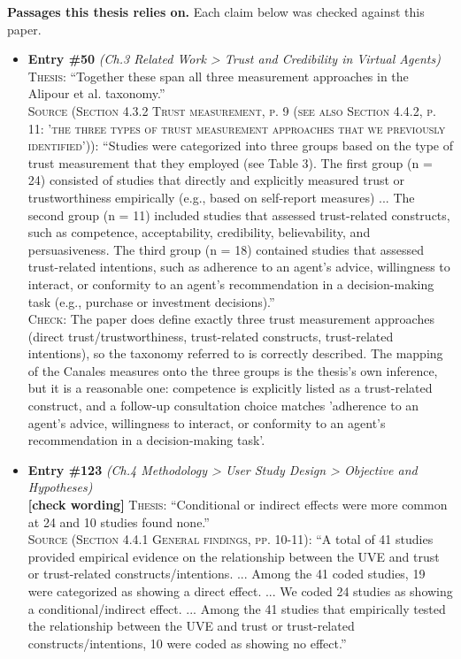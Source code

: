 \documentclass[11pt, a4paper]{article}
\begin{document}
\textbf{Passages this thesis relies on.} Each claim below was checked against this paper.
\begin{itemize}[leftmargin=1.2em,itemsep=4pt]
\item \textbf{Entry \#50} \textit{(Ch.3 Related Work > Trust and Credibility in Virtual Agents)}\\
\textsc{Thesis:} ``Together these span all three measurement approaches in the Alipour et al. taxonomy.''\\
\textsc{Source (Section 4.3.2 Trust measurement, p. 9 (see also Section 4.4.2, p. 11: 'the three types of trust measurement approaches that we previously identified')):} ``Studies were categorized into three groups based on the type of trust measurement that they employed (see Table 3). The first group (n = 24) consisted of studies that directly and explicitly measured trust or trustworthiness empirically (e.g., based on self-report measures) ... The second group (n = 11) included studies that assessed trust-related constructs, such as competence, acceptability, credibility, believability, and persuasiveness. The third group (n = 18) contained studies that assessed trust-related intentions, such as adherence to an agent's advice, willingness to interact, or conformity to an agent's recommendation in a decision-making task (e.g., purchase or investment decisions).''\\
\textsc{Check:} The paper does define exactly three trust measurement approaches (direct trust/trustworthiness, trust-related constructs, trust-related intentions), so the taxonomy referred to is correctly described. The mapping of the Canales measures onto the three groups is the thesis's own inference, but it is a reasonable one: competence is explicitly listed as a trust-related construct, and a follow-up consultation choice matches 'adherence to an agent's advice, willingness to interact, or conformity to an agent's recommendation in a decision-making task'.
\item \textbf{Entry \#123} \textit{(Ch.4 Methodology > User Study Design > Objective and Hypotheses)}\\
\textcolor{partialorange}{\textbf{[check wording]}} \textsc{Thesis:} ``Conditional or indirect effects were more common at 24 and 10 studies found none.''\\
\textsc{Source (Section 4.4.1 General findings, pp. 10-11):} ``A total of 41 studies provided empirical evidence on the relationship between the UVE and trust or trust-related constructs/intentions. ... Among the 41 coded studies, 19 were categorized as showing a direct effect. ... We coded 24 studies as showing a conditional/indirect effect. ... Among the 41 studies that empirically tested the relationship between the UVE and trust or trust-related constructs/intentions, 10 were coded as showing no effect.''\\

\end{itemize}
\end{document}
